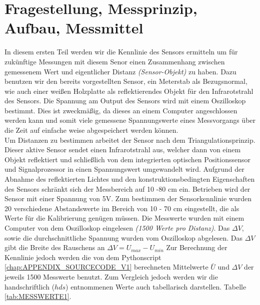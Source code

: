 \documentclass[12pt,oneside,a4paper]{report}
\begin{document}
\section{Fragestellung, Messprinzip, Aufbau, Messmittel}
\label{chap:VERSUCH_1_FRAGESTELLUNG}
In diesem ersten Teil werden wir die Kennlinie des Sensors ermitteln um für zukünftige Messungen mit diesem Senor einen Zusammenhang zwischen gemessenem Wert und eigentlicher Distanz \textit{(Sensor-Objekt)} zu haben. 
Dazu benutzen wir den bereits vorgestellten Sensor, ein Meterstab als Bezugsnormal, wie auch einer weißen Holzplatte als reflektierendes Objekt für den Infrarotstrahl des Sensors. Die Spannung am Output des Sensors wird mit einem Oszilloskop bestimmt. Dies ist zweckmäßig, da dieses an einem Computer angeschlossen werden kann und somit viele gemessene Spannungswerte eines Messvorgangs über die Zeit auf einfache weise abgespeichert werden können. 
\\
Um Distanzen zu bestimmen arbeitet der Sensor nach dem Triangulationsprinzip. Dieser aktive Sensor sendet einen Infrarotstrahl aus, welcher dann von einem Objekt reflektiert und schließlich von dem integrierten optischen Positionssensor und Signalprozessor in einen Spannungswert umgewandelt wird. Aufgrund der Abnahme des reflektierten Lichtes und den konstruktionsbedingten Eigenschaften des Sensors schränkt sich der Messbereich auf 10 -80 cm ein. Betrieben wird der Sensor mit einer Spannung von 5V.
Zum bestimmen der Sensorkennlinie wurden 20 verschiedene Abstandswerte im Bereich von 10 - 70 cm eingestellt, die als Werte für die Kalibrierung genügen müssen. Die Messwerte wurden mit einem Computer von dem Oszilloskop eingelesen \textit{(1500 Werte pro Distanz)}. Das $\Delta V$, sowie die durchschnittliche Spannung wurden vom Oszilloskop abgelesen. Das $\Delta V$ gibt die Breite des Rauschens an $\Delta V = U_{max} - U_{min}$ 
Zur Berechnung der Kennlinie jedoch werden die von dem Pythonscript \ref{chap:APPENDIX_SOURCECODE_V1} berechneten Mittelwerte $\bar{U}$ und $\Delta V$ der jeweils 1500 Messwerte benutzt. Zum Vergleich jedoch werden wir die handschriftlich ($hds$) entnommenen Werte auch tabellarisch darstellen. Tabelle \ref{tab:MESSWERTE1}. 
\end{document}
